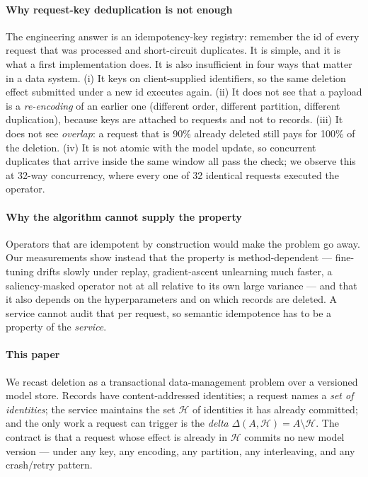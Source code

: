 \documentclass[conference]{IEEEtran}
\newcommand{\Hset}{\mathcal{H}}
\begin{document}
\paragraph{Why request-key deduplication is not enough}
The engineering answer is an idempotency-key registry: remember the id of every
request that was processed and short-circuit duplicates.  It is simple, and it is
what a first implementation does.  It is also insufficient in four ways that matter
in a data system.  (i) It keys on client-supplied identifiers, so the same deletion
effect submitted under a new id executes again.  (ii) It does not see that a payload
is a \emph{re-encoding} of an earlier one (different order, different partition,
different duplication), because keys are attached to requests and not to records.
(iii) It does not see \emph{overlap}: a request that is 90\% already deleted still
pays for 100\% of the deletion.  (iv) It is not atomic with the model update, so
concurrent duplicates that arrive inside the same window all pass the check; we
observe this at 32-way concurrency, where every one of 32 identical requests
executed the operator.

\paragraph{Why the algorithm cannot supply the property}
Operators that are idempotent by construction would make the problem go away.  Our
measurements show instead that the property is method-dependent --- fine-tuning drifts
slowly under replay, gradient-ascent unlearning much faster, a saliency-masked
operator not at all relative to its own large variance --- and that it also depends on
the hyperparameters and on which records are deleted.  A service cannot audit that
per request, so semantic idempotence has to be a property of the \emph{service}.

\paragraph{This paper}
We recast deletion as a transactional data-management problem over a versioned
model store.  Records have content-addressed identities; a request names a
\emph{set of identities}; the service maintains the set $\Hset$ of identities it has
already committed; and the only work a request can trigger is the \emph{delta}
$\Delta(A,\Hset)=A\setminus\Hset$.  The contract is that a request whose effect is
already in $\Hset$ commits no new model version --- under any key, any encoding, any
partition, any interleaving, and any crash/retry pattern.
\end{document}
